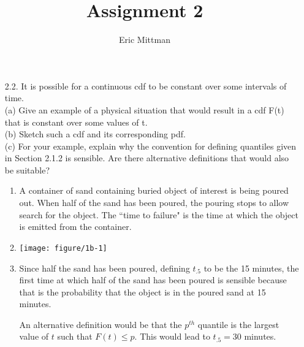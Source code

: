 \documentclass[12pt]{article}\usepackage[]{graphicx}\usepackage[]{color}
\author{Eric Mittman}
\title{Assignment 2}
\newenvironment{knitrout}{}{} %
\begin{document}
\maketitle
\begin{enumerate}
\item[2.2.] It is possible for a continuous cdf to be constant over some intervals of time.\\
(a) Give an example of a physical situation that would result in a cdf F(t) that is constant over some values of t.\\
(b) Sketch such a cdf and its corresponding pdf.\\
(c) For your example, explain why the convention for defining quantiles given in Section 2.1.2 is sensible. Are there alternative definitions that would also be suitable?\\
\begin{enumerate}
  \item
  A container of sand containing buried object of interest is being poured out. When half of the sand has been poured, the pouring stops to allow search for the object. The ``time to failure" is the time at which the object is emitted from the container.
  
  \item
\begin{knitrout}
\color{fgcolor}
\texttt{[image: figure/1b-1]} 

\end{knitrout}
  \item Since half the sand has been poured, defining $t_{.5}$ to be the 15 minutes, the first time at which half of the sand has been poured is sensible because that is the probability that the object is in the poured sand at 15 minutes.
  
  An alternative definition would be that the $p^{th}$ quantile is the largest value of $t$ such that $F(t) \le p$. This would lead to $t_{.5} = 30$ minutes.
\end{enumerate}



\end{enumerate}
\end{document}
